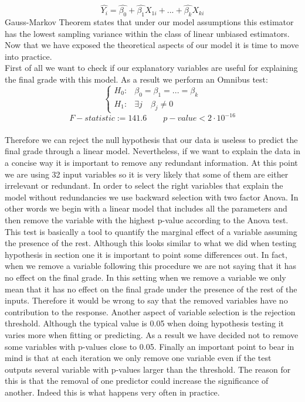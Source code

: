 \documentclass[a4paper, 11pt]{article}
\theoremstyle{definition}
\numberwithin{equation}{section}		%
\numberwithin{table}{section}				%
\begin{document}
$$\hat{Y_i} = \hat{\beta_0} + \hat{\beta_1}X_{1i} + ... +\hat{\beta_k}X_{ki}$$
Gauss-Markov Theorem states that under our model assumptions this estimator has the lowest sampling variance within the class of linear unbiased estimators. Now that we have exposed the theoretical aspects of our model it is time to move into practice.\\[0.3in]
First of all we want to check if our explanatory variables are useful for explaining the final grade with this model. As a result we perform an Omnibus test:
\begin{equation}
    \begin{cases}
      H_0:  & \beta_0 = \beta_1 = ... = \beta_k \\
      H_1:  & \exists j \quad  \beta_j \neq 0
    \end{cases}
  \end{equation}
  \bigskip
$$\boxed{F-statistic := 141.6 \quad \quad  p-value < 2\cdot 10^{-16}}$$
\\[0.2in]
Therefore we can reject the null hypothesis that our data is useless to predict the final grade through a linear model. Nevertheless, if we want to explain the data in a concise way it is important to remove any redundant information. At this point we are using 32 input variables so it is very likely that some of them are either irrelevant or redundant. In order to select the right variables that explain the model without redundancies we use backward selection with two factor Anova. In other words we begin with a linear model that includes all the parameters and then remove the variable with the highest p-value according to the Anova test. This test is basically a tool to quantify the marginal effect of a variable assuming the presence of the rest. Although this looks similar to what we did when testing hypothesis in section one it is important to point some differences out. In fact, when we remove a variable following this procedure we are not saying that it has no effect on the final grade. In this setting when we remove a variable we only mean that it has no effect on the final grade under the presence of the rest of the inputs. Therefore it would be wrong to say that the removed variables have no contribution to the response. Another aspect of variable selection is the rejection threshold. Although the typical value is 0.05 when doing hypothesis testing it varies more when fitting or predicting. As a result we have decided not to remove some variables with p-values close to 0.05. Finally an important point to bear in mind is that at each iteration we only remove one variable even if the test outputs several variable with p-values larger than the threshold. The reason for this is that the removal of one predictor could increase the significance of another. Indeed this is what happens very often in practice. 
\end{document}
